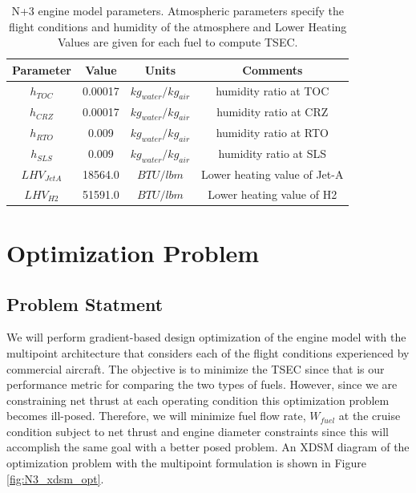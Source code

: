 \documentclass[conf]{new-aiaa}
\begin{document}
\begin{table}[hbt!]
    \centering
    \caption{
        N+3 engine model parameters.
        Atmospheric parameters specify the flight conditions and humidity of the atmosphere and Lower Heating Values are given for each fuel to compute TSEC.}
    \begin{tabular}{c c c c}
        \hline
        Parameter    & Value   & Units                 & Comments                                        \\
        \hline
        $h_{TOC}$    & 0.00017 & $kg_{water}/kg_{air}$ & humidity ratio at TOC \cite{Kalnay1996}         \\
        $h_{CRZ}$    & 0.00017 & $kg_{water}/kg_{air}$ & humidity ratio at CRZ \cite{Kalnay1996}         \\
        $h_{RTO}$    & 0.009   & $kg_{water}/kg_{air}$ & humidity ratio at RTO \cite{Kalnay1996}         \\
        $h_{SLS}$    & 0.009   & $kg_{water}/kg_{air}$ & humidity ratio at SLS \cite{Kalnay1996}         \\
        $LHV_{JetA}$ & 18564.0 & $BTU/lbm$             & Lower heating value of Jet-A \cite{Lawicki2002} \\
        $LHV_{H2}$   & 51591.0 & $BTU/lbm$             & Lower heating value of H2 \cite{toolbox2003}    \\
        \hline
    \end{tabular}
    \label{engine_params}
\end{table}

\section{Optimization Problem}
\label{sec:optprob}

\subsection{Problem Statment}
We will perform gradient-based design optimization of the engine model with the multipoint architecture that considers each of the flight conditions experienced by commercial aircraft.
The objective is to minimize the TSEC since that is our performance metric for comparing the two types of fuels.
However, since we are constraining net thrust at each operating condition this optimization problem becomes ill-posed.
Therefore, we will minimize fuel flow rate, $W_{fuel}$ at the cruise condition subject to net thrust and engine diameter constraints since this will accomplish the same goal with a better posed problem.
An XDSM diagram of the optimization problem with the multipoint formulation is shown in Figure \ref{fig:N3_xdsm_opt}.
\end{document}
